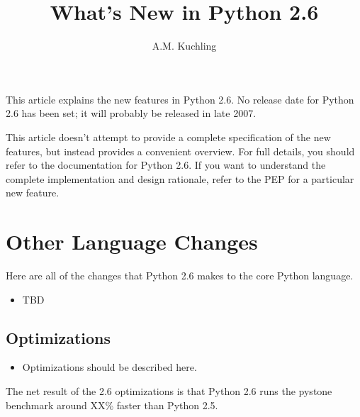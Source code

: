 \documentclass{howto}
\title{What's New in Python 2.6}
\author{A.M. Kuchling}
\begin{document}
\maketitle
\tableofcontents

This article explains the new features in Python 2.6.  No release date
for Python 2.6 has been set; it will probably be released in late 2007.


This article doesn't attempt to provide a complete specification of
the new features, but instead provides a convenient overview.  For
full details, you should refer to the documentation for Python 2.6.
If you want to understand the complete implementation and design
rationale, refer to the PEP for a particular new feature.





\section{Other Language Changes}

Here are all of the changes that Python 2.6 makes to the core Python
language.

\begin{itemize}
\item TBD

\end{itemize}


\subsection{Optimizations}

\begin{itemize}

\item Optimizations should be described here.

\end{itemize}

The net result of the 2.6 optimizations is that Python 2.6 runs the
pystone benchmark around XX\% faster than Python 2.5.
\end{document}
